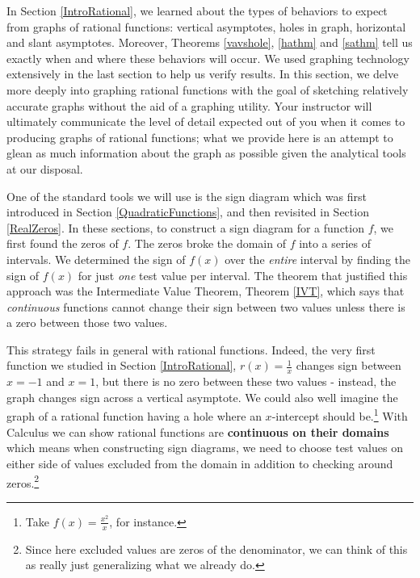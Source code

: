 \documentclass{ximera}
\begin{document}
	\author{Stitz-Zeager}




\setcounter{footnote}{0}

\label{RationalGraphs}

In Section \ref{IntroRational}, we learned about the types of behaviors to expect from graphs of rational functions: vertical asymptotes, holes in graph, horizontal and slant asymptotes.   Moreover,  Theorems \ref{vavshole}, \ref{hathm} and \ref{sathm} tell us exactly when and where these behaviors will occur.  We used graphing technology extensively in the last section to help us verify results. In this section, we delve more deeply into graphing rational functions with the goal of sketching relatively accurate graphs without the aid of a graphing utility.  Your instructor will ultimately communicate the level of detail expected out of you when it comes to producing graphs of rational functions;  what we provide here is an attempt to glean as much information about the graph as possible given the analytical tools at our disposal.  

  \smallskip

One of the standard tools we will use is the sign diagram which was first introduced in Section \ref{QuadraticFunctions}, and then revisited in Section \ref{RealZeros}. In these sections,  to construct a sign diagram for a function $f$, we first found the zeros of $f$.  The zeros broke  the domain of $f$ into a series of intervals.  We determined the sign of $f(x)$ over the \textit{entire} interval by finding the sign of $f(x)$ for just \textit{one} test value per interval.  The theorem that justified this approach was the Intermediate Value Theorem, Theorem \ref{IVT}, which says that \textit{continuous} functions cannot change their sign between two values unless there is a zero  between those two values. 

This strategy fails in  general with rational functions.  Indeed, the very first  function we studied in Section \ref{IntroRational}, $r(x) = \frac{1}{x}$ changes sign between $x=-1$ and $x=1$, but there is no zero between these two values - instead, the graph changes sign across a vertical asymptote.  We could also well imagine the graph of a rational function having a hole where an $x$-intercept should be.\footnote{Take $f(x) = \frac{x^2}{x}$, for instance.}  With Calculus we can show rational functions are \textbf{continuous on their domains} which means when constructing sign diagrams, we need to choose test values on either side of values excluded from the domain in addition to checking around zeros.\footnote{Since here excluded values are zeros of the denominator, we can think of this as really just generalizing what we already do.}
\end{document}
